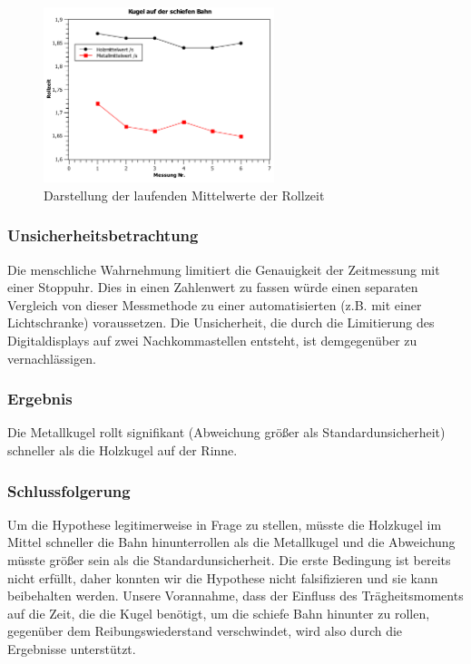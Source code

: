 \documentclass[
	a4paper,
	12pt,
	pagesize,
	ngerman
]{scrartcl}
\begin{document}
	\begin{figure}[htb]
	  \centering
	    \includegraphics[width=0.6\textwidth]{Kugel_auf_schiefer_Bahn} %
	  \caption{Darstellung der laufenden Mittelwerte der Rollzeit}
	\end{figure}
	\subsubsection{Unsicherheitsbetrachtung}
	Die menschliche Wahrnehmung limitiert die Genauigkeit der Zeitmessung mit einer Stoppuhr. Dies in einen Zahlenwert zu fassen würde einen separaten Vergleich von dieser Messmethode zu einer automatisierten (z.B. mit einer Lichtschranke) voraussetzen. Die Unsicherheit, die durch die Limitierung des Digitaldisplays auf zwei Nachkommastellen entsteht, ist demgegenüber zu vernachlässigen.
	\subsubsection{Ergebnis}
	Die Metallkugel rollt signifikant (Abweichung größer als Standardunsicherheit) schneller als die Holzkugel auf der Rinne.
	\subsubsection{Schlussfolgerung}
	Um die Hypothese legitimerweise in Frage zu stellen, müsste die Holzkugel im Mittel schneller die Bahn hinunterrollen als die Metallkugel und die Abweichung müsste größer sein als die Standardunsicherheit. Die erste Bedingung ist bereits nicht erfüllt, daher konnten wir die Hypothese nicht falsifizieren und sie kann beibehalten werden. Unsere Vorannahme, dass der Einfluss des Trägheitsmoments auf die Zeit, die die Kugel benötigt, um die schiefe Bahn hinunter zu rollen, gegenüber dem Reibungswiederstand verschwindet, wird also durch die Ergebnisse unterstützt.
	
	
\end{document}
